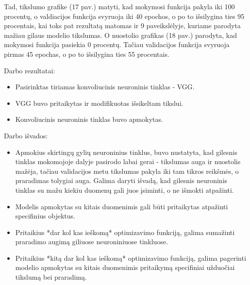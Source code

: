 \documentclass{VUMIFPSkursinis}
\begin{document}
Tad, tikslumo grafike (17 pav.) matyti, kad mokymosi funkcija pakyla iki 100 procentų, o valdiacijos funkcija svyruoja iki 40 epochos, o po to išsilygina ties 95 procentais, kai toks pat rezultatą matomas ir 9 paveikslėlyje, kuriame parodyta mažiau gilaus modelio tikslumas.
O nuostolio grafikas (18 pav.) parodyta, kad mokymosi funkcija pasiekia 0 procentų. Tačiau validacijos funkcija svyruoja pirmas 45 epochas, o po to išsilygina ties 55 procentais.

Darbo rezultatai:
\begin{itemize}
\item Pasirinktas tiriamas konvoliucinis neuroninis tinklas - VGG.
\item VGG buvo pritaikytas ir modifikuotas išsikeltam tikslui.
\item Konvoliucinis neuroninis tinklas buvo apmokytas.
\end{itemize}


Darbo išvados:
\begin{itemize}
\item Apmokius skirtingų gylių neuroninius tinklus, buvo nustatyta, kad gilesnis tinklas mokomojoje dalyje pasirodo labai gerai - tikslumas auga ir nuostolis mažėja, tačiau 
validacijos metu tikslumas pakyla iki tam tikros reikšmės, o praradimas tolygiai auga. Galima daryti išvadą, kad gilesnis neuroninis tinklas su mažu kiekiu duomenų gali juos 
įsiminti, o ne išmokti atpažinti.
\item Modelis apmokytas su kitais duomenimis gali būti pritaikytas atpažinti specifinius objektus.
\item Pritaikius *dar kol kas ieškomą* optimizavimo funkciją, galima sumažinti praradimo augimą giliuose neuroniniuose tinkluose.
\item Pritaikius *kitą dar kol kas ieškomą* optimizavimo funkciją, galima pagerinti modelio apmokytas su kitais duomenimis pritaikymą specifiniai užduočiai tikslumą bei praradimą.
\end{itemize}

\printbibliography[heading=bibintoc] 
\end{document}
